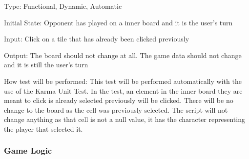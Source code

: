 \documentclass[12pt, titlepage]{article}
\begin{document}
\begin{enumerate}
Type: Functional, Dynamic, Automatic
					
Initial State: Opponent has played on a inner board and it is the user's turn
					
Input: Click on a tile that has already been clicked previously
					
Output: The board should not change at all. The game data should not change and it is still the user's turn
					
How test will be performed: This test will be performed automatically with the use of the Karma Unit Test. In the test, an element in the inner board they are meant to click is already selected previously will be clicked. There will be no change to the board as the cell was previously selected. The script will not change anything as that cell is not a null value, it has the character representing the player that selected it.

\end{enumerate}

\subsubsection{Game Logic}
\end{document}
